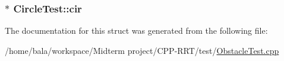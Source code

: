 \subsubsection[{\texorpdfstring{cir}{cir}}]{$\ast$ Circle\+Test\+::cir}\hypertarget{structCircleTest_aa15185e431282de6d6480bffde3f2be3}{}\label{structCircleTest_aa15185e431282de6d6480bffde3f2be3}


The documentation for this struct was generated from the following file\+:\begin{DoxyCompactItemize}
\item 
/home/bala/workspace/\+Midterm project/\+C\+P\+P-\/\+R\+R\+T/test/\hyperlink{ObstacleTest_8cpp}{Obstacle\+Test.\+cpp}\end{DoxyCompactItemize}
